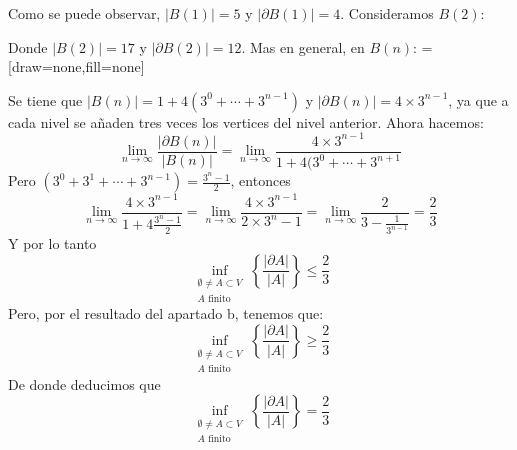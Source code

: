 \documentclass{article}
\begin{document}
\begin{enumerate}
\begin{enumerate}
\begin{center}\end{center}
Como se puede observar, $\lvert B(1) \rvert = 5$ y $\lvert \partial B(1) \rvert = 4$. Consideramos $B(2)$:
\begin{center}\end{center}
Donde $\lvert B(2) \rvert = 17$ y $\lvert \partial B(2) \rvert = 12$. Mas en general, en $B(n)$:
=[draw=none,fill=none]
\begin{center}\end{center}
Se tiene que $\lvert B(n) \rvert = 1 + 4(3^0 + \cdots + 3^{n-1})$ y
$\lvert \partial B(n) \rvert = 4\times3^{n-1}$, ya que a cada nivel se añaden tres veces los vertices del
nivel anterior. Ahora hacemos:
\[
\lim_{n \to \infty} \frac{\lvert \partial B(n) \rvert}{\lvert B(n) \rvert} =
\lim_{n \to \infty} \frac{4\times3^{n-1}}{1 + 4(3^0 + \cdots + 3^{n+1}}
\]
Pero $(3^0 + 3^1 + \cdots + 3^{n-1}) = \frac{3^n-1}{2}$, entonces 
\[
\lim_{n \to \infty} \frac{4\times3^{n-1}}{1 + 4 \frac{3^n - 1}{2}} = 
\lim_{n \to \infty} \frac{4\times3^{n-1}}{2\times 3^n - 1} = 
\lim_{n \to \infty} \frac{2}{3 - \frac{1}{3^{n-1}}} = \frac{2}{3}
\]
Y por lo tanto
\[
\inf_{\substack{\emptyset \neq A \subset V \\ A \text{ finito}}}
\left\{ \frac{\lvert \partial A \rvert}{\lvert A \rvert} \right\} \leq \frac{2}{3}
\]
Pero, por el resultado del apartado b, tenemos que:
\[
\inf_{\substack{\emptyset \neq A \subset V \\ A \text{ finito}}}
\left\{ \frac{\lvert \partial A \rvert}{\lvert A \rvert} \right\} \geq \frac{2}{3}
\]
De donde deducimos que
\[
\inf_{\substack{\emptyset \neq A \subset V \\ A \text{ finito}}}
\left\{ \frac{\lvert \partial A \rvert}{\lvert A \rvert} \right\} = \frac{2}{3}
\]
\end{enumerate}
\end{enumerate}
\end{document}
